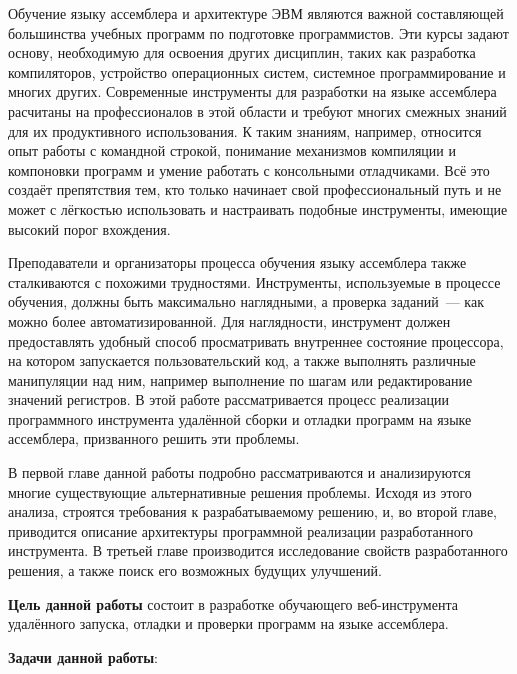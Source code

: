 \documentclass[a4paper,article,14pt]{extarticle}
\begin{document}


\tableofcontents
\pagebreak


Обучение языку ассемблера и архитектуре ЭВМ являются важной составляющей большинства учебных программ по подготовке программистов. Эти курсы задают основу, необходимую для освоения других дисциплин, таких как разработка компиляторов, устройство операционных систем, системное программирование и многих других. Современные инструменты для разработки на языке ассемблера расчитаны на профессионалов в этой области и требуют многих смежных знаний для их продуктивного использования. К таким знаниям, например, относится опыт работы с командной строкой, понимание механизмов компиляции и компоновки программ и умение работать с консольными отладчиками. Всё это создаёт препятствия тем, кто только начинает свой профессиональный путь и не может с лёгкостью использовать и настраивать подобные инструменты, имеющие высокий порог вхождения.

Преподаватели и организаторы процесса обучения языку ассемблера также сталкиваются с похожими трудностями. Инструменты, используемые в процессе обучения, должны быть максимально наглядными, а проверка заданий~--- как можно более автоматизированной. Для наглядности, инструмент должен предоставлять удобный способ просматривать внутреннее состояние процессора, на котором запускается пользовательский код, а также выполнять различные манипуляции над ним, например выполнение по шагам или редактирование значений регистров. В этой работе рассматривается процесс реализации программного инструмента удалённой сборки и отладки программ на языке ассемблера, призванного решить эти проблемы.

В первой главе данной работы подробно рассматриваются и анализируются многие существующие альтернативные решения проблемы. Исходя из этого анализа, строятся требования к разрабатываемому решению, и, во второй главе, приводится описание архитектуры программной реализации разработанного инструмента. В третьей главе производится исследование свойств разработанного решения, а также поиск его возможных будущих улучшений.

\pagebreak
{}

\textbf{Цель данной работы} состоит в разработке обучающего веб-инструмента удалённого запуска, отладки и проверки программ на языке ассемблера.

\textbf{Задачи данной работы}:
\end{document}
